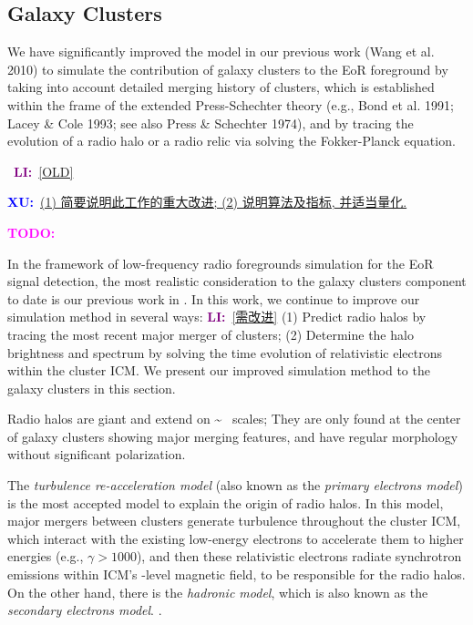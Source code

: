 \documentclass[modern]{aastex61}
\newcommand{\TODO}[1]{\textcolor{magenta}{\textbf{TODO:}}~\uuline{#1}}
\newcommand{\XU}[1]{\textcolor{blue}{\textbf{XU:}}~\uline{#1}}
\newcommand{\LI}[1]{\textcolor{purple}{\textbf{LI:}}~\uline{#1}}
\begin{document}
\subsection{Galaxy Clusters}
\label{sec:fg-clusters}

We have significantly improved the model in our previous work (Wang et al.
2010) to simulate the contribution of galaxy clusters
to the EoR foreground by taking into account detailed merging history of
clusters, which is established within the frame of
the extended Press-Schechter theory (e.g., Bond et al. 1991; Lacey \& Cole
1993; see also Press \& Schechter 1974), and by
tracing the evolution of a radio halo or a radio relic via solving the
Fokker-Planck equation.

\noindent\hrulefill~\LI{[OLD]}~\hrulefill

\XU{(1) 简要说明此工作的重大改进; (2) 说明算法及指标, 并适当量化.}

\TODO{Rewrite this overview!!!}

In the framework of low-frequency radio foregrounds simulation for the
EoR signal detection, the most realistic consideration to the galaxy
clusters component to date is our previous work in \citeyear{wang2010}
\citep{wang2010}.
In this work, we continue to improve our simulation method in several
ways: \LI{[需改进]}
(1) Predict radio halos by tracing the most recent major merger of clusters;
(2) Determine the halo brightness and spectrum by solving the time
evolution of relativistic electrons within the cluster ICM.
We present our improved simulation method to the galaxy clusters in this
section.

Radio halos are giant and extend on \si{\sim \Mpc} scales;
They are only found at the center of galaxy clusters showing major
merging features, and have regular morphology without significant
polarization.

The \emph{turbulence re-acceleration model} (also known as the
\emph{primary electrons model}) is the most accepted model to explain
the origin of radio halos.
In this model, major mergers between clusters generate turbulence
throughout the cluster ICM, which interact with the existing low-energy
electrons to accelerate them to higher energies (e.g., $\gamma > 1000$),
and then these relativistic electrons radiate synchrotron emissions
within ICM's \si{\uG}-level magnetic field, to be responsible for the
radio halos.
On the other hand, there is the \emph{hadronic model}, which is also
known as the \emph{secondary electrons model}.
\citep[see][for recent reviews]{feretti2012rev,brunetti2014rev}.
\end{document}
